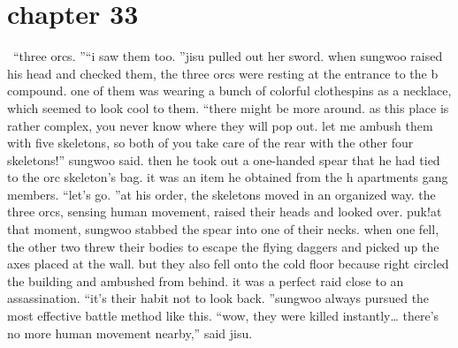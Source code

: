 \section{chapter 33}






 “three orcs.
”“i saw them too.
”jisu pulled out her sword.
when sungwoo raised his head and checked them, the three orcs were resting at the entrance to the b compound.
one of them was wearing a bunch of colorful clothespins as a necklace, which seemed to look cool to them.
“there might be more around.
 as this place is rather complex, you never know where they will pop out.
 let me ambush them with five skeletons, so both of you take care of the rear with the other four skeletons!” sungwoo said.
then he took out a one-handed spear that he had tied to the orc skeleton’s bag.
 it was an item he obtained from the h apartments gang members.
“let’s go.
”at his order, the skeletons moved in an organized way.
the three orcs, sensing human movement, raised their heads and looked over.
puk!at that moment, sungwoo stabbed the spear into one of their necks.
when one fell, the other two threw their bodies to escape the flying daggers and picked up the axes placed at the wall.
but they also fell onto the cold floor because right circled the building and ambushed from behind.
 it was a perfect raid close to an assassination.
“it’s their habit not to look back.
”sungwoo always pursued the most effective battle method like this.
“wow, they were killed instantly… there’s no more human movement nearby,” said jisu.

